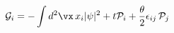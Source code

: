 \begin{equation}
     {\cal G}_{i}=-\int d^2\vx\,x_{i}\vert\psi\vert^2
     +t{\cal P}_{i}
     +\frac{\theta}{2}\epsilon_{ij}\,{\cal P}_{j}
     \label{exoboost}
\end{equation}

